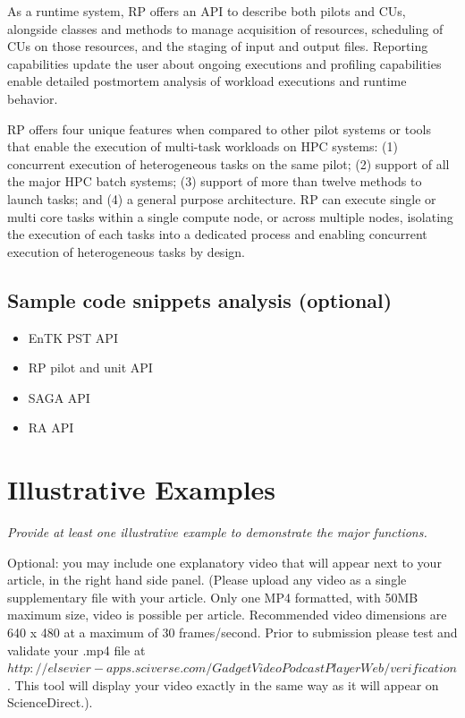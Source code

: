 \documentclass[preprint,12pt, a4paper]{elsarticle}
\begin{document}
As a runtime system, RP offers an API to describe both pilots and CUs,
alongside classes and methods to manage acquisition of resources, scheduling
of CUs on those resources, and the staging of input and output files.
Reporting capabilities update the user about ongoing executions and profiling
capabilities enable detailed postmortem analysis of workload executions and
runtime behavior.

RP offers four unique features when compared to other pilot systems or tools
that enable the execution of multi-task workloads on HPC systems: (1)
concurrent execution of heterogeneous tasks on the same pilot; (2) support of
all the major HPC batch systems; (3) support of more than twelve methods to
launch tasks; and (4) a general purpose architecture. RP can execute single
or multi core tasks within a single compute node, or across multiple nodes, 
isolating the execution of each tasks into a dedicated process and enabling
concurrent execution of heterogeneous tasks by design.

\subsection{Sample code snippets analysis (optional)}\label{ssec:code}

\begin{itemize}
  \item EnTK PST API
  \item RP pilot and unit API
  \item SAGA API
  \item RA API
\end{itemize}

\section{Illustrative Examples}\label{sec:examples}

{\em Provide at least one illustrative example to demonstrate the major
functions.

Optional: you may include one explanatory video that will appear next to your
article, in the right hand side panel. (Please upload any video as a single
supplementary file with your article. Only one MP4 formatted, with 50MB
maximum size, video is possible per article. Recommended video dimensions are
640 x 480 at a maximum of 30 frames/second. Prior to submission please test
and validate your .mp4 file at $
http://elsevier-apps.sciverse.com/GadgetVideoPodcastPlayerWeb/verification$.
This tool will display your video exactly in the same way as it will appear
on ScienceDirect.).}
\end{document}
